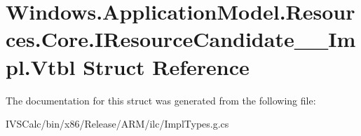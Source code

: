 \hypertarget{struct_windows_1_1_application_model_1_1_resources_1_1_core_1_1_i_resource_candidate_____impl_1_1_vtbl}{}\section{Windows.\+Application\+Model.\+Resources.\+Core.\+I\+Resource\+Candidate\+\_\+\+\_\+\+Impl.\+Vtbl Struct Reference}
\label{struct_windows_1_1_application_model_1_1_resources_1_1_core_1_1_i_resource_candidate_____impl_1_1_vtbl}


The documentation for this struct was generated from the following file\+:\begin{DoxyCompactItemize}
\item 
I\+V\+S\+Calc/bin/x86/\+Release/\+A\+R\+M/ilc/Impl\+Types.\+g.\+cs\end{DoxyCompactItemize}
